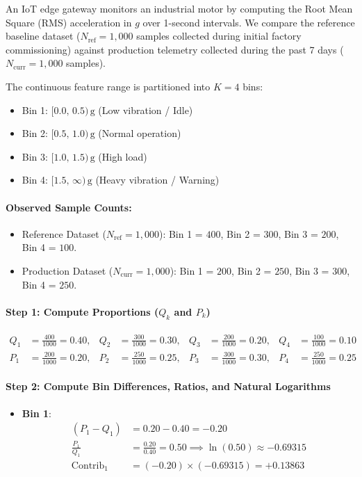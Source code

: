 \begin{example}
An IoT edge gateway monitors an industrial motor by computing the Root Mean Square (RMS) acceleration in $g$ over 1-second intervals. We compare the reference baseline dataset ($N_{\text{ref}} = 1{,}000$ samples collected during initial factory commissioning) against production telemetry collected during the past 7 days ($N_{\text{curr}} = 1{,}000$ samples).

The continuous feature range is partitioned into $K = 4$ bins:
\begin{itemize}
    \item Bin 1: $[0.0,\, 0.5)\,\text{g}$ (Low vibration / Idle)
    \item Bin 2: $[0.5,\, 1.0)\,\text{g}$ (Normal operation)
    \item Bin 3: $[1.0,\, 1.5)\,\text{g}$ (High load)
    \item Bin 4: $[1.5,\, \infty)\,\text{g}$ (Heavy vibration / Warning)
\end{itemize}

\paragraph{Observed Sample Counts:}
\begin{itemize}
    \item Reference Dataset ($N_{\text{ref}} = 1{,}000$): Bin 1 = $400$, Bin 2 = $300$, Bin 3 = $200$, Bin 4 = $100$.
    \item Production Dataset ($N_{\text{curr}} = 1{,}000$): Bin 1 = $200$, Bin 2 = $250$, Bin 3 = $300$, Bin 4 = $250$.
\end{itemize}

\paragraph{Step 1: Compute Proportions ($Q_k$ and $P_k$)}
\begin{align*}
Q_1 &= \frac{400}{1000} = 0.40, & Q_2 &= \frac{300}{1000} = 0.30, & Q_3 &= \frac{200}{1000} = 0.20, & Q_4 &= \frac{100}{1000} = 0.10 \\
P_1 &= \frac{200}{1000} = 0.20, & P_2 &= \frac{250}{1000} = 0.25, & P_3 &= \frac{300}{1000} = 0.30, & P_4 &= \frac{250}{1000} = 0.25
\end{align*}

\paragraph{Step 2: Compute Bin Differences, Ratios, and Natural Logarithms}
\begin{itemize}
    \item \textbf{Bin 1}:
    \begin{align*}
    (P_1 - Q_1) &= 0.20 - 0.40 = -0.20 \\
    \frac{P_1}{Q_1} &= \frac{0.20}{0.40} = 0.50 \implies \ln(0.50) \approx -0.69315 \\
    \text{Contrib}_1 &= (-0.20) \times (-0.69315) = \mathbf{+0.13863}
    \end{align*}


\end{itemize}
\end{example}
